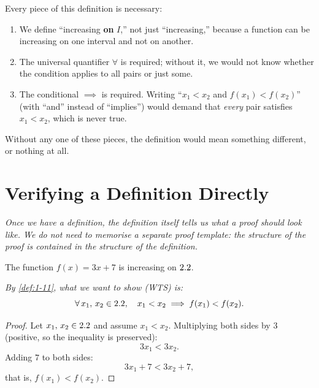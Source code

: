 \begin{remark}
Every piece of this definition is necessary:
\begin{enumerate}[label=(\arabic*)]
  \item We define ``increasing \textbf{on} $I$\!,'' not just ``increasing,'' because a function can be increasing on one interval and not on another.
  \item The universal quantifier $\forall$ is required; without it, we would not know whether the condition applies to all pairs or just some.
  \item The conditional $\implies$ is required.  Writing ``$x_{1} < x_{2}$ and $f(x_{1}) < f(x_{2})$'' (with ``and'' instead of ``implies'') would demand that \textit{every} pair satisfies $x_{1} < x_{2}$, which is never true.
\end{enumerate}
Without any one of these pieces, the definition would mean something different, or nothing at all.
\end{remark}

\section{Verifying a Definition Directly}
\label{sec:1.11}

\textit{Once we have a definition, the definition itself tells us what a proof should look like.  We do not need to memorise a separate proof template: the structure of the proof is contained in the structure of the definition.}

\begin{theorem}
\label{thm:1-9}
The function $f(x) = 3x + 7$ is increasing on $2.2$.
\end{theorem}

\textit{By \cref{def:1-11}, what we want to show (WTS) is:}
\[
  \forall\, x_{1},\, x_{2} \in 2.2, \quad x_{1} < x_{2} \implies f(x_{1}) < f(x_{2}).
\]

\begin{proof}
Let $x_{1},\, x_{2} \in 2.2$ and assume $x_{1} < x_{2}$.  Multiplying both sides by $3$ (positive, so the inequality is preserved):
\[
  3x_{1} < 3x_{2}.
\]
Adding $7$ to both sides:
\[
  3x_{1} + 7 < 3x_{2} + 7,
\]
that is, $f(x_{1}) < f(x_{2})$.
\end{proof}

